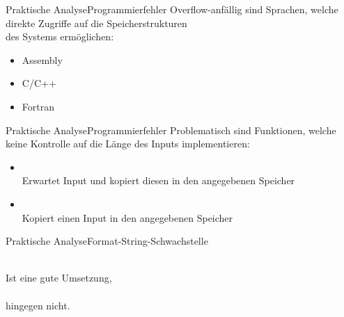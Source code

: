 \begin{frame}{Praktische Analyse}{Programmierfehler}
    Overflow-anfällig sind Sprachen, welche direkte Zugriffe auf die Speicherstrukturen\\ des Systems ermöglichen:
    \begin{itemize}
        \vspace{1em}
        \item Assembly
        \item C/C++
        \item Fortran
    \end{itemize}
\end{frame}

\begin{frame}{Praktische Analyse}{Programmierfehler}
    Problematisch sind Funktionen, welche
    keine Kontrolle auf die Länge des Inputs implementieren: %
    \begin{itemize}
        \vspace{1em}
        \item {}\\ Erwartet Input und kopiert diesen in den angegebenen Speicher
        \vspace{1em}
        \item {}\\ Kopiert einen Input
        in den angegebenen Speicher
    \end{itemize}
\end{frame}


\begin{frame}{Praktische Analyse}{Format-String-Schwachstelle}
   
    \\ Ist eine gute Umsetzung,\\
    \\ hingegen nicht.
\end{frame}

